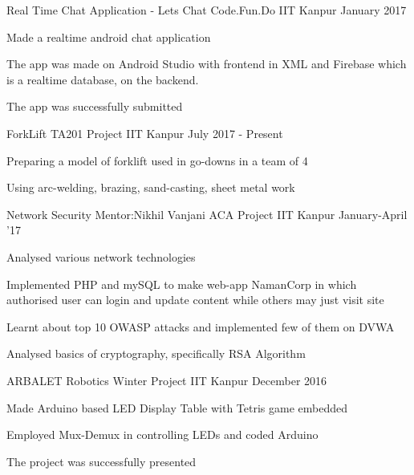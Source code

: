 \begin{cventries}
  \cventry
    {Real Time Chat Application - Lets Chat}
    {Code.Fun.Do}
    {IIT Kanpur}
    {January 2017}
    {
      \begin{cvitems}
        \item {Made a realtime android chat application}
        \item {The app was made on Android Studio with frontend in XML and Firebase which is a realtime database, on the backend.}
        \item {The app was successfully submitted}
      \end{cvitems}
    }
    \cventry
    {ForkLift}
    {TA201 Project}
    {IIT Kanpur}
    {July 2017 - Present}
    {
      \begin{cvitems}
        \item {Preparing a model of forklift used in go-downs in a team of 4}
        \item {Using arc-welding, brazing, sand-casting, sheet metal work}
      \end{cvitems}
    }
    \cventry
    {Network Security\hspace{10pt} Mentor:Nikhil Vanjani}
    {ACA Project}
    {IIT Kanpur}
    {January-April '17}
    {
      \begin{cvitems}
        \item {Analysed various network technologies}
        \item {Implemented PHP and mySQL to make web-app NamanCorp in which authorised user can login and update content while others may just visit site}
        \item{Learnt about top 10 OWASP attacks and implemented few of them on DVWA}
        \item{Analysed basics of cryptography, specifically RSA Algorithm}
      \end{cvitems}
    }
    \cventry
    {ARBALET}
    {Robotics Winter Project}
    {IIT Kanpur}
    {December 2016}
    {
      \begin{cvitems}
        \item {Made Arduino based LED Display Table with Tetris game embedded}
        \item {Employed Mux-Demux in controlling LEDs and coded Arduino}
        \item {The project was successfully presented}
      \end{cvitems}
    }
    
  
\end{cventries}
